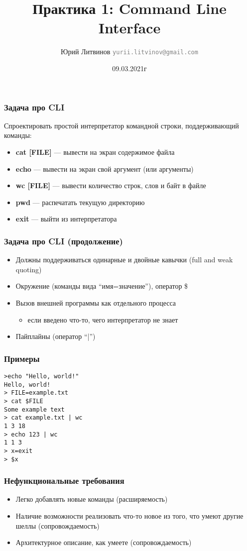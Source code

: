 \documentclass[xetex,mathserif,serif]{beamer}
\title{Практика 1: Command Line Interface}
\author[Юрий Литвинов]{Юрий Литвинов \newline \textcolor{gray}{\small\texttt{yurii.litvinov@gmail.com}}}
\date{09.03.2021г}
\begin{document}
    \frame{\titlepage}

    \begin{frame}
        \frametitle{Задача про CLI}
        Спроектировать простой интерпретатор командной строки, поддерживающий команды:
        \begin{itemize}
            \item \textbf{cat [FILE]} --- вывести на экран содержимое файла
            \item \textbf{echo} --- вывести на экран свой аргумент (или аргументы)
            \item \textbf{wc [FILE]} --- вывести количество строк, слов и байт в файле
            \item \textbf{pwd} --- распечатать текущую директорию
            \item \textbf{exit} --- выйти из интерпретатора
        \end{itemize}
    \end{frame}
    
    \begin{frame}
        \frametitle{Задача про CLI (продолжение)}
        \begin{itemize}
            \item Должны поддерживаться одинарные и двойные кавычки (full and weak quoting)
            \item Окружение (команды вида ``имя=значение''), оператор \$
            \item Вызов внешней программы как отдельного процесса
            \begin{itemize}
                \item если введено что-то, чего интерпретатор не знает
            \end{itemize}
            \item Пайплайны (оператор ``|'')
        \end{itemize}
    \end{frame}
    
    \begin{frame}[fragile]
        \frametitle{Примеры}
\begin{verbatim}
>echo "Hello, world!"
Hello, world!
> FILE=example.txt
> cat $FILE
Some example text
> cat example.txt | wc
1 3 18
> echo 123 | wc
1 1 3
> x=exit
> $x
        \end{verbatim}
    \end{frame}

    \begin{frame}
        \frametitle{Нефункциональные требования}
        \begin{itemize}
            \item Легко добавлять новые команды (расширяемость)
            \item Наличие возможности реализовать что-то новое из того, что умеют другие шеллы (сопровождаемость)
            \item Архитектурное описание, как умеете (сопровождаемость)
        \end{itemize}
    \end{frame}
    
\end{document}

